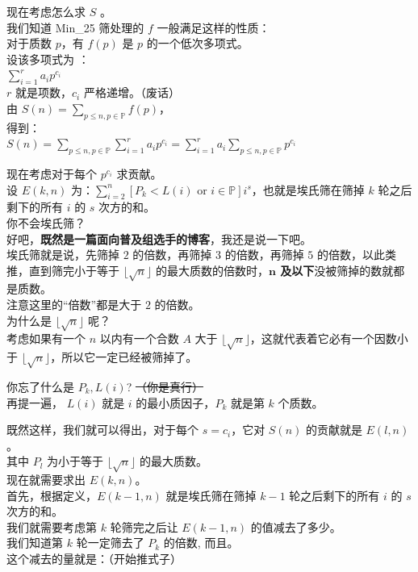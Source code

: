 \documentclass[
]{article}
\begin{document}
现在考虑怎么求 \(S\) 。\\
我们知道 Min\_25 筛处理的 \(f\) 一般满足这样的性质：\\
对于质数 \(p\)，有 \(f(p)\) 是 \(p\) 的一个低次多项式。\\
设该多项式为 ： \\
\(\sum_{i=1}^r a_ip^{c_i}\)\\
\(r\) 就是项数，\(c_i\) 严格递增。（废话）\\
由 \(S(n)=\displaystyle\sum_{p\le n,p\in\mathbb{P}}f(p)\)，\\
得到：\\
\(S(n)=\displaystyle\sum_{p\le n,p\in\mathbb{P}}\displaystyle\sum_{i=1}^r a_ip^{c_i}=\displaystyle\sum_{i=1}^r a_i\displaystyle\sum_{p\le n,p\in\mathbb{P}}p^{c_i}\)

现在考虑对于每个 \(p^{c_i}\) 求贡献。\\
设 \(E(k,n)\)
为：\(\displaystyle\sum_{i=2}^n [P_k<L(i) \,\,\text{or}\,\, i\in\mathbb{P}]i^s\)，也就是埃氏筛在筛掉
\(k\) 轮之后剩下的所有 \(i\) 的 \(s\) 次方的和。\\
你不会埃氏筛？\\
好吧，\textbf{既然是一篇面向普及组选手的博客}，我还是说一下吧。\\
埃氏筛就是说，先筛掉 \(2\) 的倍数，再筛掉 \(3\) 的倍数，再筛掉 \(5\)
的倍数，以此类推，直到筛完小于等于 \(\lfloor\sqrt{n}\rfloor\)
的最大质数的倍数时，\textbf{\(\textbf{n}\)
及以下}没被筛掉的数就都是质数。\\
注意这里的``倍数''都是大于 \(2\) 的倍数。\\
为什么是 \(\lfloor\sqrt{n}\rfloor\) 呢？\\
考虑如果有一个 \(n\) 以内有一个合数 \(A\) 大于
\(\lfloor\sqrt{n}\rfloor\)，这就代表着它必有一个因数小于
\(\lfloor\sqrt{n}\rfloor\)，所以它一定已经被筛掉了。

你忘了什么是 \(P_k,L(i)\)? \st{（你是真行）}\\
再提一遍， \(L(i)\) 就是 \(i\) 的最小质因子，\(P_k\) 就是第 \(k\)
个质数。

既然这样，我们就可以得出，对于每个 \(s=c_i\)，它对 \(S(n)\) 的贡献就是
\(E(l,n)\)。\\
其中 \(P_l\) 为小于等于 \(\lfloor\sqrt{n}\rfloor\) 的最大质数。\\
现在就需要求出 \(E(k,n)\)。\\
首先，根据定义，\(E(k-1,n)\) 就是埃氏筛在筛掉 \(k-1\) 轮之后剩下的所有
\(i\) 的 \(s\) 次方的和。\\
我们就需要考虑第 \(k\) 轮筛完之后让 \(E(k-1,n)\) 的值减去了多少。\\
我们知道第 \(k\) 轮一定筛去了 \(P_k\) 的倍数, 而且。\\
这个减去的量就是：（开始推式子）
\end{document}
